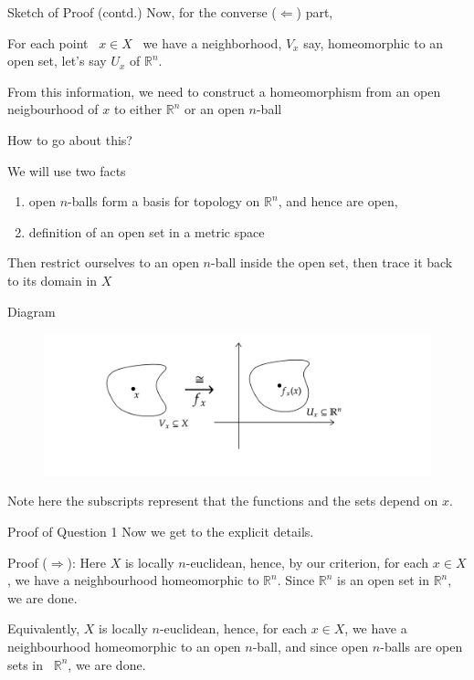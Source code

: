 \documentclass{beamer}
\begin{document}
\begin{frame}{Sketch of Proof (contd.)}
Now, for the converse ($\displaystyle \Leftarrow $) part,

For each point \ $\displaystyle x\in X$ \ we have a neighborhood, $\displaystyle V_{x}$ say, homeomorphic to an open set, let's say $\displaystyle U_{x}$ of $\displaystyle \mathbb{R}^{n}$. 

From this information, we need to construct a homeomorphism from an open neigbourhood of $\displaystyle x$ to either $\displaystyle \mathbb{R}^{n}$ or an open $\displaystyle n$-ball 

How to go about this? 

We will use two facts 
\begin{enumerate}
\item open $\displaystyle n$-balls form a basis for topology on $\displaystyle \mathbb{R}^{n}$, and hence are open, 
\item definition of an open set in a metric space 
\end{enumerate}

Then restrict ourselves to an open $\displaystyle n$-ball inside the open set, then trace it back to its domain in $\displaystyle X$ 
\end{frame}
\begin{frame}{Diagram}
\begin{figure}
    \centering
    \centering
    \includegraphics[width = 1.1\textwidth]{diag-1.png}

\end{figure}
Note here the subscripts represent that the functions and the sets \alert{depend} on $x$.
\end{frame}
\begin{frame}{Proof of Question 1}
Now we get to the explicit details. 
\begin{block}{Proof}
($\displaystyle \Rightarrow $): Here $\displaystyle X$ is locally $\displaystyle n$-euclidean, hence, by our criterion, for each $\displaystyle x\in X$, we have a neighbourhood homeomorphic to $\displaystyle \mathbb{R}^{n}$. Since $\displaystyle \mathbb{R}^{n}$ is an open set in $\displaystyle \mathbb{R}^{n}$, we are done. 

Equivalently, $\displaystyle X$ is locally $\displaystyle n$-euclidean, hence, for each $\displaystyle x\in X$, we have a neighbourhood homeomorphic to an open $\displaystyle n$-ball, and since open $\displaystyle n$-balls are open sets in \ $\displaystyle \mathbb{R}^{n}$, we are done. 
\end{block}
\end{frame}
\end{document}
